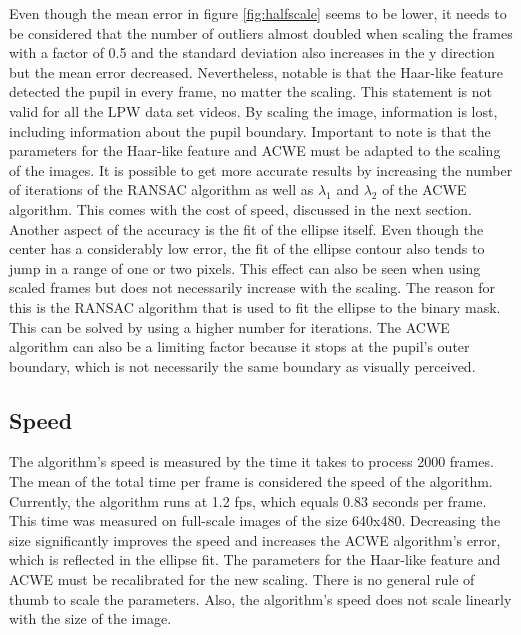 Even though the mean error in figure \ref{fig:halfscale} seems to be lower, it needs to be considered that the number of outliers almost doubled when scaling the frames with a factor of 0.5 and the standard deviation also increases in the y direction but the mean error decreased. Nevertheless,  notable is that the Haar-like feature detected the pupil in every frame, no matter the scaling. This statement is not valid for all the LPW data set videos. By scaling the image, information is lost, including information about the pupil boundary. Important to note is that the parameters for the Haar-like feature and ACWE must be adapted to the scaling of the images. 
It is possible to get more accurate results by increasing the number of iterations of the RANSAC algorithm as well as $\lambda_1$ and $\lambda_2$ of the ACWE algorithm. This comes with the cost of speed, discussed in the next section. 
Another aspect of the accuracy is the fit of the ellipse itself. Even though the center has a considerably low error, the fit of the ellipse contour also tends to jump in a range of one or two pixels. This effect can also be seen when using scaled frames but does not necessarily increase with the scaling. The reason for this is the RANSAC algorithm that is used to fit the ellipse to the binary mask. This can be solved by using a higher number for iterations. The ACWE algorithm can also be a limiting factor because it stops at the pupil's outer boundary, which is not necessarily the same boundary as visually perceived.
\subsection{Speed}
The algorithm's speed is measured by the time it takes to process 2000 frames. The mean of the total time per frame is considered the speed of the algorithm. Currently, the algorithm runs at 1.2 fps, which equals 0.83  seconds per frame. This time was measured on full-scale images of the size 640x480. Decreasing the size significantly improves the speed and increases the ACWE algorithm's error, which is reflected in the ellipse fit. The parameters for the Haar-like feature and ACWE must be recalibrated for the new scaling. There is no general rule of thumb to scale the parameters. Also,  the algorithm's speed does not scale linearly with the size of the image.
